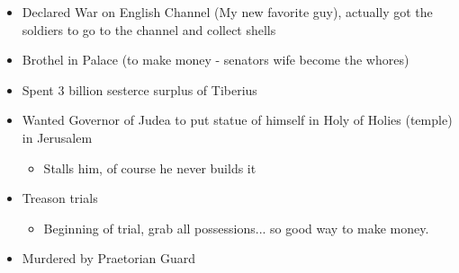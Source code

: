 \documentclass[12pt, twoside]{article}
\begin{document}
\begin{itemize}
\item Declared War on English Channel (My new favorite guy), actually got the soldiers to go to the channel and collect shells
\item Brothel in Palace (to make money - senators wife become the whores)
\item Spent 3 billion sesterce surplus of Tiberius
\item Wanted Governor of Judea to put statue of himself in Holy of Holies (temple) in Jerusalem
	\begin{itemize}
	\item Stalls him, of course he never builds it
	\end{itemize}
\item Treason trials
	\begin{itemize}
	\item Beginning of trial, grab all possessions... so good way to make money.
	\end{itemize}
\item Murdered by Praetorian Guard
\end{itemize}
\end{document}
